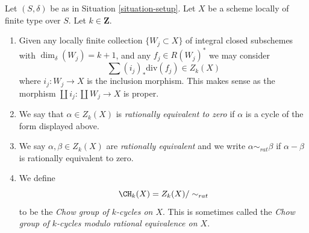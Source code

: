 \begin{definition}
\label{definition-rational-equivalence}
Let $(S, \delta)$ be as in Situation \ref{situation-setup}.
Let $X$ be a scheme locally of finite type over $S$.
Let $k \in \mathbf{Z}$.
\begin{enumerate}
\item Given any locally finite collection $\{W_j \subset X\}$
of integral closed subschemes with $\dim_\delta(W_j) = k + 1$,
and any $f_j \in R(W_j)^*$ we may consider
$$
\sum (i_j)_*\text{div}(f_j) \in Z_k(X)
$$
where $i_j : W_j \to X$ is the inclusion morphism.
This makes sense as the morphism
$\coprod i_j : \coprod W_j \to X$ is proper.
\item We say that $\alpha \in Z_k(X)$ is {\it rationally equivalent to zero}
if $\alpha$ is a cycle of the form displayed above.
\item We say $\alpha, \beta \in Z_k(X)$ are
{\it rationally equivalent} and we write $\alpha \sim_{rat} \beta$
if $\alpha - \beta$ is rationally equivalent to zero.
\item We define
$$
\CH_k(X) = Z_k(X) / \sim_{rat}
$$
to be the {\it Chow group of $k$-cycles on $X$}. This is sometimes called
the {\it Chow group of $k$-cycles modulo rational equivalence on $X$}.
\end{enumerate}
\end{definition}